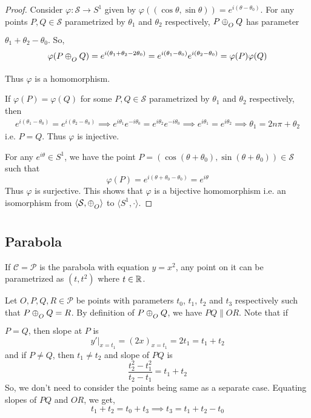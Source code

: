 \begin{proof}
    Consider $\varphi\colon\mathcal{S} \to S^1$ given by
    $\varphi((\cos\theta,\sin\theta)) = e^{i(\theta-\theta_0)}$. For any points
    $P,Q\in\mathcal{S}$ parametrized by $\theta_1$ and $\theta_2$ respectively,
    $P \conop Q$ has parameter $\theta_1 + \theta_2 - \theta_0$. So,
    \[
        \varphi(P \conop Q) = e^{i(\theta_1 + \theta_2 - 2\theta_0)}
        = e^{i(\theta_1 - \theta_0)}e^{i(\theta_2 - \theta_0)} = \varphi(P)\varphi(Q)
    \]
    Thus $\varphi$ is a homomorphism.
    \vspace{1ex}

    \noindent
    If $\varphi(P)=\varphi(Q)$ for some $P,Q\in\mathcal{S}$ parametrized by
    $\theta_1$ and $\theta_2$ respectively, then
    \begin{align*}
        e^{i(\theta_1-\theta_0)} = e^{i(\theta_2-\theta_0)}
        \implies e^{i\theta_1}e^{-i\theta_0} = e^{i\theta_2}e^{-i\theta_0}
        \implies e^{i\theta_1} = e^{i\theta_2}
        \implies \theta_1 = 2n\pi + \theta_2
    \end{align*}
    i.e. $P=Q$. Thus $\varphi$ is injective.
    \vspace{1ex}

    \noindent
    For any $e^{i\theta} \in S^1$, we have the point
    $P=(\cos(\theta+\theta_0),\sin(\theta+\theta_0)) \in \mathcal{S}$ such that
    \[ \varphi(P) = e^{i(\theta + \theta_0 - \theta_0)} = e^{i\theta} \]
    Thus $\varphi$ is surjective. This shows that $\varphi$ is a bijective
    homomorphism i.e. an isomorphism from $\langle \mathcal{S},\conop \rangle$ to
    $\langle S^1,\cdot \rangle$.
\end{proof}

\subsection*{Parabola}

If $\mathcal{C}=\mathcal{P}$ is the parabola with equation $y=x^2$, any point on
it can be parametrized as $(t,t^2)$ where $t\in\mathbb{R}$.
\vspace{1ex}

Let $O,P,Q,R\in\mathcal{P}$ be points with parameters $t_0$, $t_1$, $t_2$ and
$t_3$ respectively such that $P \conop Q = R$. By definition of $P \conop Q$, we
have $PQ \parallel OR$. Note that if $P=Q$, then slope at $P$ is
\[
    y'|_{x=t_1} = \left(2x\right)_{x=t_1} = 2t_1 = t_1 + t_2
\]
and if $P \neq Q$, then $t_1 \neq t_2$ and slope of $PQ$ is 
\[
    \frac{t_2^2-t_1^2}{t_2-t_1} = t_1 + t_2
\]
So, we don't need to consider the points being same as a separate case. Equating
slopes of $PQ$ and $OR$, we get,
\[ t_1 + t_2 = t_0 + t_3 \implies t_3 = t_1 + t_2 - t_0 \]

